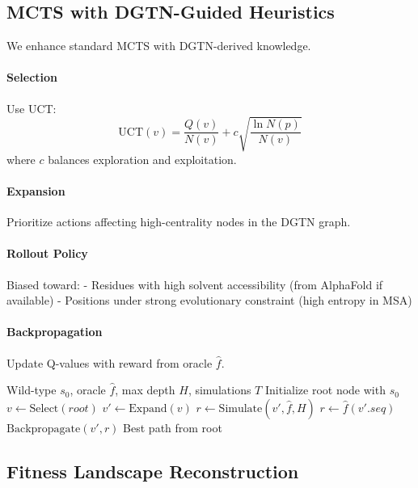 \documentclass[11pt]{article}
\begin{document}
\subsection{MCTS with DGTN-Guided Heuristics}
\label{sec:mcts}

We enhance standard MCTS with DGTN-derived knowledge.

\paragraph{Selection} Use UCT:
\[
\mathrm{UCT}(v) = \frac{Q(v)}{N(v)} + c \sqrt{\frac{\ln N(p)}{N(v)}}
\]
where $c$ balances exploration and exploitation.

\paragraph{Expansion} Prioritize actions affecting high-centrality nodes in the DGTN graph.

\paragraph{Rollout Policy} Biased toward:
- Residues with high solvent accessibility (from AlphaFold if available)
- Positions under strong evolutionary constraint (high entropy in MSA)

\paragraph{Backpropagation} Update Q-values with reward from oracle $\hat{f}$.

\begin{algorithm}[H]
\caption{EnzyMCTS Search}
\begin{algorithmic}
 Wild-type $s_0$, oracle $\hat{f}$, max depth $H$, simulations $T$
\STATE Initialize root node with $s_0$
    \STATE $v \leftarrow \text{Select}(root)$
    \STATE $v' \leftarrow \text{Expand}(v)$
        \STATE $r \leftarrow \text{Simulate}(v', \hat{f}, H)$
    \ELSE
        \STATE $r \leftarrow \hat{f}(v'.seq)$
    \ENDIF
    \STATE $\text{Backpropagate}(v', r)$
\ENDFOR
{} Best path from root
\end{algorithmic}
\end{algorithm}

\subsection{Fitness Landscape Reconstruction}
\label{sec:landscape}
\end{document}
